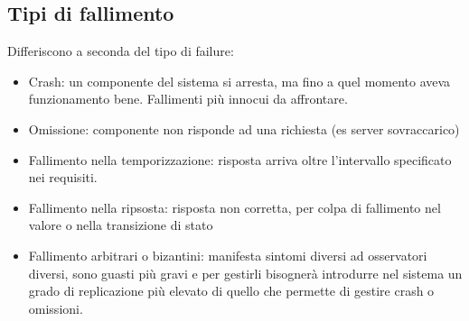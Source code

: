 \documentclass{article}
\begin{document}
\subsection{Tipi di fallimento}
Differiscono a seconda del tipo di failure:
\begin{itemize}
\item Crash: un componente del sistema si arresta, ma fino a quel momento aveva funzionamento bene. Fallimenti più innocui da affrontare.
\item Omissione: componente non risponde ad una richiesta (es server sovraccarico)
\item Fallimento nella temporizzazione: risposta arriva oltre l'intervallo specificato nei requisiti.
\item Fallimento nella ripsosta: risposta non corretta, per colpa di fallimento nel valore o nella transizione di stato
\item Fallimento arbitrari o bizantini: manifesta sintomi diversi ad osservatori diversi, sono guasti più gravi e per gestirli bisognerà introdurre nel sistema un grado di replicazione più elevato di quello che permette di gestire crash o omissioni.
\end{itemize}
\end{document}
